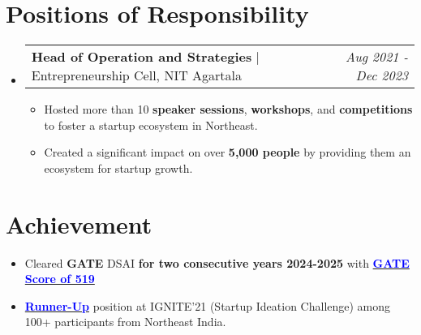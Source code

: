 \documentclass[a4paper,11pt]{article}
\makeatletter
\newcommand{\resumePOR}[3]{
\vspace{0.5mm}\item
    \begin{tabular*}{0.97\textwidth}[t]{l@{\extracolsep{\fill}}r}
        \textbf{#1}\hspace{0.3mm}#2 & \textit{\small{#3}} 
    \end{tabular*}
    \vspace{-2mm}
}
\newcommand{\resumeSubHeadingListStart}{\begin{itemize}[leftmargin=*,labelsep=0mm]}
\newcommand{\resumeItemListStart}{\begin{justify}\begin{itemize}[leftmargin=3ex, rightmargin=2ex, noitemsep,labelsep=1.2mm,itemsep=0mm]\small}
\newcommand{\resumeSubHeadingListEnd}{\end{itemize}\vspace{2mm}}
\newcommand{\resumeItemListEnd}{\end{itemize}\end{justify}\vspace{-2mm}}
\makeatother
\begin{document}
\section{\textbf{Positions of Responsibility}}
\vspace{-2mm}
\resumeSubHeadingListStart
\resumePOR{Head of Operation and Strategies } %
    {| Entrepreneurship Cell, NIT Agartala} %
    {Aug 2021 - Dec 2023} %
    \resumeItemListStart
\item Hosted more than 10 \textbf{speaker sessions}, \textbf{workshops}, and \textbf{competitions} to foster a startup ecosystem in Northeast.
    \item Created a significant impact on over \textbf{5,000 people} by providing them an ecosystem for startup growth.
    \resumeItemListEnd

\resumeSubHeadingListEnd
\vspace{-7mm}

\section{\textbf{Achievement}}
\vspace{-0.4mm}

    \resumeItemListStart
\item Cleared \textbf{GATE} DSAI \textbf{for two consecutive years 2024-2025} with \textbf{\href{https://drive.google.com/file/d/1UpbCIcsCu5D63btW4_GaFTny7aUMrL-z/view?usp=sharing}{\textcolor{blue}{GATE Score of 519}}}
    \item \textbf{\href{https://drive.google.com/file/d/1mtsd7VvkWesBoY2TFoTx8x9AE_BZCOOp/view?usp=drivesdk}{\textcolor{blue}{Runner-Up}}} position at IGNITE’21 (Startup Ideation Challenge) among 100+ participants from Northeast India.
    \resumeItemListEnd




    
\end{document}
